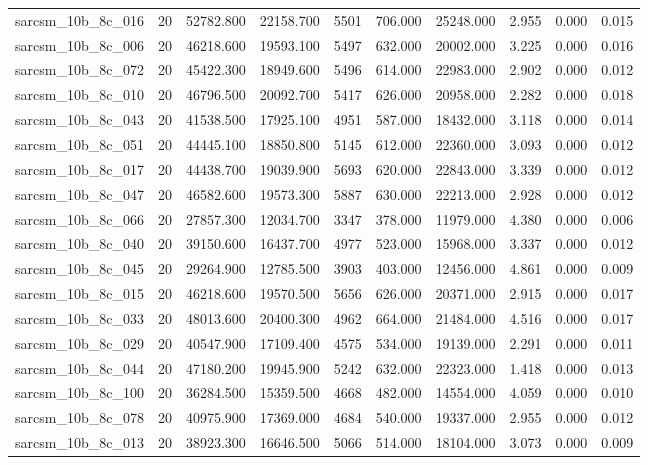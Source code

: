 \begin{tabular}{lrrrrrrrrr}
sarcsm\_10b\_8c\_016 & 20 & 52782.800 & 22158.700 & 5501 & 706.000 & 25248.000 & 2.955 & 0.000 & 0.015 \\
sarcsm\_10b\_8c\_006 & 20 & 46218.600 & 19593.100 & 5497 & 632.000 & 20002.000 & 3.225 & 0.000 & 0.016 \\
sarcsm\_10b\_8c\_072 & 20 & 45422.300 & 18949.600 & 5496 & 614.000 & 22983.000 & 2.902 & 0.000 & 0.012 \\
sarcsm\_10b\_8c\_010 & 20 & 46796.500 & 20092.700 & 5417 & 626.000 & 20958.000 & 2.282 & 0.000 & 0.018 \\
sarcsm\_10b\_8c\_043 & 20 & 41538.500 & 17925.100 & 4951 & 587.000 & 18432.000 & 3.118 & 0.000 & 0.014 \\
sarcsm\_10b\_8c\_051 & 20 & 44445.100 & 18850.800 & 5145 & 612.000 & 22360.000 & 3.093 & 0.000 & 0.012 \\
sarcsm\_10b\_8c\_017 & 20 & 44438.700 & 19039.900 & 5693 & 620.000 & 22843.000 & 3.339 & 0.000 & 0.012 \\
sarcsm\_10b\_8c\_047 & 20 & 46582.600 & 19573.300 & 5887 & 630.000 & 22213.000 & 2.928 & 0.000 & 0.012 \\
sarcsm\_10b\_8c\_066 & 20 & 27857.300 & 12034.700 & 3347 & 378.000 & 11979.000 & 4.380 & 0.000 & 0.006 \\
sarcsm\_10b\_8c\_040 & 20 & 39150.600 & 16437.700 & 4977 & 523.000 & 15968.000 & 3.337 & 0.000 & 0.012 \\
sarcsm\_10b\_8c\_045 & 20 & 29264.900 & 12785.500 & 3903 & 403.000 & 12456.000 & 4.861 & 0.000 & 0.009 \\
sarcsm\_10b\_8c\_015 & 20 & 46218.600 & 19570.500 & 5656 & 626.000 & 20371.000 & 2.915 & 0.000 & 0.017 \\
sarcsm\_10b\_8c\_033 & 20 & 48013.600 & 20400.300 & 4962 & 664.000 & 21484.000 & 4.516 & 0.000 & 0.017 \\
sarcsm\_10b\_8c\_029 & 20 & 40547.900 & 17109.400 & 4575 & 534.000 & 19139.000 & 2.291 & 0.000 & 0.011 \\
sarcsm\_10b\_8c\_044 & 20 & 47180.200 & 19945.900 & 5242 & 632.000 & 22323.000 & 1.418 & 0.000 & 0.013 \\
sarcsm\_10b\_8c\_100 & 20 & 36284.500 & 15359.500 & 4668 & 482.000 & 14554.000 & 4.059 & 0.000 & 0.010 \\
sarcsm\_10b\_8c\_078 & 20 & 40975.900 & 17369.000 & 4684 & 540.000 & 19337.000 & 2.955 & 0.000 & 0.012 \\
sarcsm\_10b\_8c\_013 & 20 & 38923.300 & 16646.500 & 5066 & 514.000 & 18104.000 & 3.073 & 0.000 & 0.009 \\

\end{tabular}
